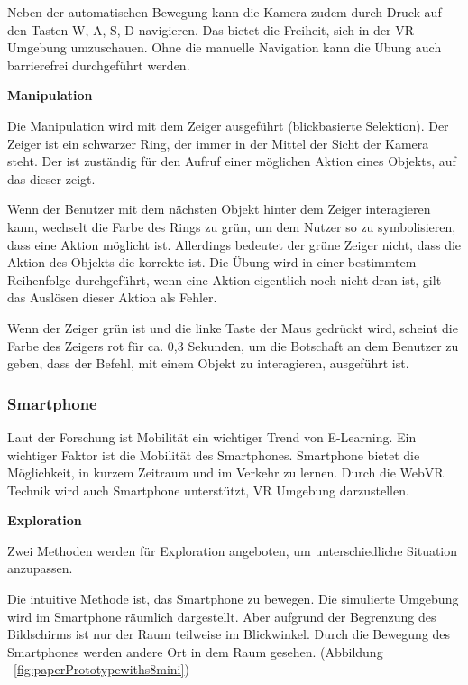   Neben der automatischen Bewegung kann die Kamera zudem durch Druck auf den Tasten W, A, S, D navigieren. Das bietet die Freiheit, sich in der VR Umgebung umzuschauen. Ohne die manuelle Navigation kann die Übung auch barrierefrei durchgeführt werden.
  
  \vspace{1em}
  \noindent
  \textbf{Manipulation}
  \vspace{1em}
  
  \noindent
  Die Manipulation wird mit dem Zeiger ausgeführt (blickbasierte Selektion). Der Zeiger ist ein schwarzer Ring, der immer in der Mittel der Sicht der Kamera steht. Der ist zuständig für den Aufruf einer möglichen Aktion eines Objekts, auf das dieser zeigt.
  
  Wenn der Benutzer mit dem nächsten Objekt hinter dem Zeiger interagieren kann, wechselt die Farbe des Rings zu grün, um dem Nutzer so zu symbolisieren, dass eine Aktion möglicht ist. Allerdings bedeutet der grüne Zeiger nicht, dass die Aktion des Objekts die korrekte ist. Die Übung wird in einer bestimmtem Reihenfolge durchgeführt, wenn eine Aktion eigentlich noch nicht dran ist, gilt das Auslösen dieser Aktion als Fehler.
  
  Wenn der Zeiger grün ist und die linke Taste der Maus gedrückt wird, scheint die Farbe des Zeigers rot für ca. 0,3 Sekunden, um die Botschaft an dem Benutzer zu geben, dass der Befehl, mit einem Objekt zu interagieren, ausgeführt ist. 
  
 \subsubsection{Smartphone}
 Laut der Forschung ist Mobilität ein wichtiger Trend von E-Learning. Ein wichtiger Faktor ist die Mobilität des Smartphones. Smartphone bietet die Möglichkeit, in kurzem Zeitraum und im Verkehr zu lernen. Durch die WebVR Technik wird auch Smartphone unterstützt, VR Umgebung darzustellen.
 
  \vspace{1em}
  \noindent
  \textbf{Exploration}
  \vspace{1em}
  
  \noindent
  Zwei Methoden werden für Exploration angeboten, um unterschiedliche Situation anzupassen.
  
  Die intuitive Methode ist, das Smartphone zu bewegen. Die simulierte Umgebung wird im Smartphone räumlich dargestellt. Aber aufgrund der Begrenzung des Bildschirms ist nur der Raum teilweise im Blickwinkel. Durch die Bewegung des Smartphones werden andere Ort in dem Raum gesehen. (Abbildung ~\ref{fig:paperPrototypewiths8mini})


